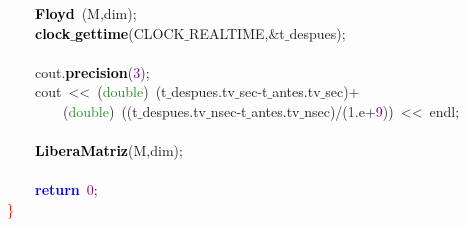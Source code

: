 \mbox{}\ \ \ \ \textbf{\textcolor{Black}{Floyd}}\ \textcolor{BrickRed}{(}M\textcolor{BrickRed}{,}dim\textcolor{BrickRed}{);} \\
\mbox{}\ \ \ \ \textbf{\textcolor{Black}{clock$\_$gettime}}\textcolor{BrickRed}{(}CLOCK$\_$REALTIME\textcolor{BrickRed}{,\&}t$\_$despues\textcolor{BrickRed}{);} \\
\mbox{}\ \ \ \  \\
\mbox{}\ \ \ \ cout\textcolor{BrickRed}{.}\textbf{\textcolor{Black}{precision}}\textcolor{BrickRed}{(}\textcolor{Purple}{3}\textcolor{BrickRed}{);} \\
\mbox{}\ \ \ \ cout\ \textcolor{BrickRed}{\textless{}\textless{}}\ \textcolor{BrickRed}{(}\textcolor{ForestGreen}{double}\textcolor{BrickRed}{)}\ \textcolor{BrickRed}{(}t$\_$despues\textcolor{BrickRed}{.}tv$\_$sec\textcolor{BrickRed}{-}t$\_$antes\textcolor{BrickRed}{.}tv$\_$sec\textcolor{BrickRed}{)+} \\
\mbox{}\ \ \ \ \ \ \ \ \textcolor{BrickRed}{(}\textcolor{ForestGreen}{double}\textcolor{BrickRed}{)}\ \textcolor{BrickRed}{((}t$\_$despues\textcolor{BrickRed}{.}tv$\_$nsec\textcolor{BrickRed}{-}t$\_$antes\textcolor{BrickRed}{.}tv$\_$nsec\textcolor{BrickRed}{)/(}\textcolor{Purple}{1}\textcolor{BrickRed}{.}e\textcolor{BrickRed}{+}\textcolor{Purple}{9}\textcolor{BrickRed}{))}\ \textcolor{BrickRed}{\textless{}\textless{}}\ endl\textcolor{BrickRed}{;} \\
\mbox{} \\
\mbox{}\ \ \ \ \textbf{\textcolor{Black}{LiberaMatriz}}\textcolor{BrickRed}{(}M\textcolor{BrickRed}{,}dim\textcolor{BrickRed}{);} \\
\mbox{}\ \ \ \  \\
\mbox{}\ \ \ \ \textbf{\textcolor{Blue}{return}}\ \textcolor{Purple}{0}\textcolor{BrickRed}{;} \\
\mbox{}\textcolor{Red}{\}}\ \ \  \\
\mbox{} \\
\mbox{}
